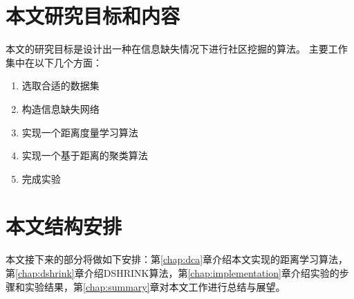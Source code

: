 \section{本文研究目标和内容}

本文的研究目标是设计出一种在信息缺失情况下进行社区挖掘的算法。
主要工作集中在以下几个方面：

\begin{enumerate}
\item 选取合适的数据集
\item 构造信息缺失网络
\item 实现一个距离度量学习算法
\item 实现一个基于距离的聚类算法
\item 完成实验
\end{enumerate}

\section{本文结构安排}

本文接下来的部分将做如下安排：第\ref{chap:dca}章介绍本文实现的距离学习算法，第\ref{chap:dshrink}章介绍DSHRINK算法，第\ref{chap:implementation}章介绍实验的步骤和实验结果，第\ref{chap:summary}章对本文工作进行总结与展望。
